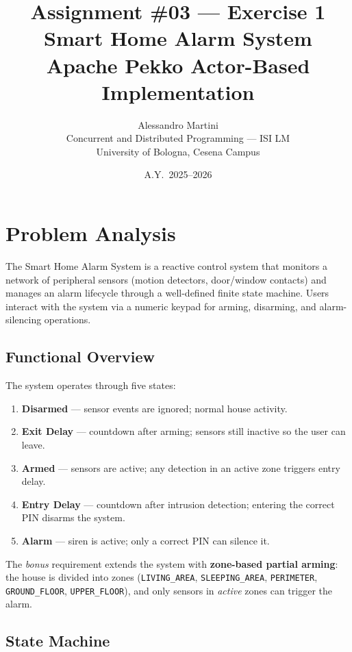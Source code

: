 \documentclass[a4paper, 12pt]{article}
\title{%
  \textbf{Assignment \#03 --- Exercise 1} \\[0.3em]
  \Large Smart Home Alarm System \\[0.2em]
  \large Apache Pekko Actor-Based Implementation
}
\author{%
  Alessandro Martini \\
  \small Concurrent and Distributed Programming --- ISI LM \\
  \small University of Bologna, Cesena Campus
}
\date{A.Y.\ 2025--2026}
\begin{document}
\maketitle

\section{Problem Analysis}

The Smart Home Alarm System is a reactive control system that monitors a network of peripheral sensors (motion detectors, door/window contacts) and manages an alarm lifecycle through a well-defined finite state machine. Users interact with the system via a numeric keypad for arming, disarming, and alarm-silencing operations.

\subsection{Functional Overview}

The system operates through five states:

\begin{enumerate}[label=\arabic*.]
  \item \textbf{Disarmed} --- sensor events are ignored; normal house activity.
  \item \textbf{Exit Delay} --- countdown after arming; sensors still inactive so the user can leave.
  \item \textbf{Armed} --- sensors are active; any detection in an active zone triggers entry delay.
  \item \textbf{Entry Delay} --- countdown after intrusion detection; entering the correct PIN disarms the system.
  \item \textbf{Alarm} --- siren is active; only a correct PIN can silence it.
\end{enumerate}

The \emph{bonus} requirement extends the system with \textbf{zone-based partial arming}: the house is divided into zones (\texttt{LIVING\_AREA}, \texttt{SLEEPING\_AREA}, \texttt{PERIMETER}, \texttt{GROUND\_FLOOR}, \texttt{UPPER\_FLOOR}), and only sensors in \emph{active} zones can trigger the alarm.

\subsection{State Machine}
\end{document}
